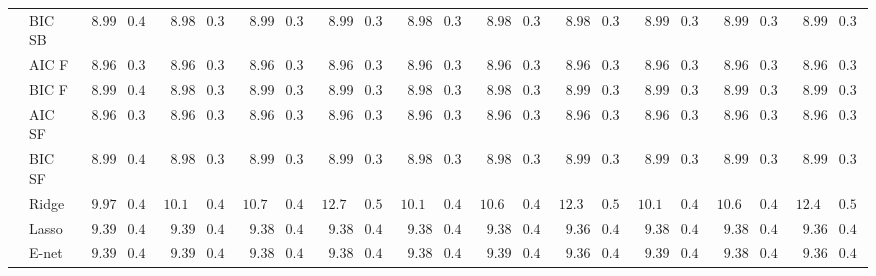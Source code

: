 \documentclass[12pt]{article}
\begin{document}
{\begin{landscape}
\begin{tabular}{ll|ll|llllll|llllll|llllll}
 & BIC SB  & $\phantom{0}8.99$ & $0.40$ & $\phantom{0}8.98$ & $0.39$ & $\phantom{0}8.99$ & $0.39$ & $\phantom{0}8.99$ & $0.39$ & $\phantom{0}8.98$ & $0.39$ & $\phantom{0}8.98$ & $0.39$ & $\phantom{0}8.98$ & $0.39$ & $\phantom{0}8.99$ & $0.39$ & $\phantom{0}8.99$ & $0.39$ & $\phantom{0}8.99$ & $0.39$ \\
 & AIC F  & $\phantom{0}8.96$ & $0.39$ & $\phantom{0}8.96$ & $0.39$ & $\phantom{0}8.96$ & $0.39$ & $\phantom{0}8.96$ & $0.39$ & $\phantom{0}8.96$ & $0.39$ & $\phantom{0}8.96$ & $0.39$ & $\phantom{0}8.96$ & $0.39$ & $\phantom{0}8.96$ & $0.39$ & $\phantom{0}8.96$ & $0.39$ & $\phantom{0}8.96$ & $0.39$ \\
 & BIC F  & $\phantom{0}8.99$ & $0.40$ & $\phantom{0}8.98$ & $0.39$ & $\phantom{0}8.99$ & $0.39$ & $\phantom{0}8.99$ & $0.39$ & $\phantom{0}8.98$ & $0.39$ & $\phantom{0}8.98$ & $0.39$ & $\phantom{0}8.99$ & $0.39$ & $\phantom{0}8.99$ & $0.39$ & $\phantom{0}8.99$ & $0.39$ & $\phantom{0}8.99$ & $0.39$ \\
 & AIC SF  & $\phantom{0}8.96$ & $0.39$ & $\phantom{0}8.96$ & $0.39$ & $\phantom{0}8.96$ & $0.39$ & $\phantom{0}8.96$ & $0.39$ & $\phantom{0}8.96$ & $0.39$ & $\phantom{0}8.96$ & $0.39$ & $\phantom{0}8.96$ & $0.39$ & $\phantom{0}8.96$ & $0.39$ & $\phantom{0}8.96$ & $0.39$ & $\phantom{0}8.96$ & $0.39$ \\
 & BIC SF  & $\phantom{0}8.99$ & $0.40$ & $\phantom{0}8.98$ & $0.39$ & $\phantom{0}8.99$ & $0.39$ & $\phantom{0}8.99$ & $0.39$ & $\phantom{0}8.98$ & $0.39$ & $\phantom{0}8.98$ & $0.39$ & $\phantom{0}8.99$ & $0.39$ & $\phantom{0}8.99$ & $0.39$ & $\phantom{0}8.99$ & $0.39$ & $\phantom{0}8.99$ & $0.39$ \\
 & Ridge  & $\phantom{0}9.97$ & $0.43$ & $10.14$ & $0.42$ & $10.76$ & $0.45$ & $12.74$ & $0.51$ & $10.14$ & $0.42$ & $10.66$ & $0.43$ & $12.39$ & $0.52$ & $10.13$ & $0.42$ & $10.65$ & $0.44$ & $12.49$ & $0.50$ \\
 & Lasso  & $\phantom{0}9.39$ & $0.42$ & $\phantom{0}9.39$ & $0.42$ & $\phantom{0}9.38$ & $0.42$ & $\phantom{0}9.38$ & $0.42$ & $\phantom{0}9.38$ & $0.41$ & $\phantom{0}9.38$ & $0.41$ & $\phantom{0}9.36$ & $0.42$ & $\phantom{0}9.38$ & $0.41$ & $\phantom{0}9.38$ & $0.41$ & $\phantom{0}9.36$ & $0.42$ \\
 & E-net  & $\phantom{0}9.39$ & $0.42$ & $\phantom{0}9.39$ & $0.42$ & $\phantom{0}9.38$ & $0.42$ & $\phantom{0}9.38$ & $0.42$ & $\phantom{0}9.38$ & $0.42$ & $\phantom{0}9.39$ & $0.41$ & $\phantom{0}9.36$ & $0.42$ & $\phantom{0}9.39$ & $0.41$ & $\phantom{0}9.38$ & $0.42$ & $\phantom{0}9.36$ & $0.41$ \\

\end{tabular}
\end{landscape}}
\end{document}
